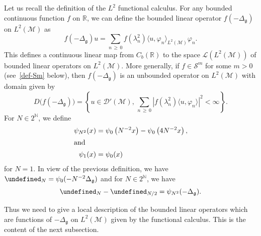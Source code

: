 \documentclass[10pt]{amsart}
\theoremstyle{definition}\newtheorem{defi}[theo]{Definition}\newtheorem{rema}[theo]{Remark}\newtheorem{exam}[theo]{Example}\newtheorem{exem}[theo]{Example}\newtheorem{nota}[theo]{Notation}
\newcommand{\R}{\mathbb{R}}
\newcommand{\N}{\mathbb{N}}
\let\P= \undefined
\newcommand{\P}{\mathbf{P}}
\renewcommand{\L}{\mathcal{L}}
\renewcommand{\S}{\mathcal{S}}
\newcommand{\Dp}{\mathcal{D}'}
\newcommand{\M}{\mathcal{M}}
\newcommand{\g}{\mathfrak{g}}
\newcommand{\Dlg}{\Delta_{\g}}
\begin{document}
Let us recall the definition of the $L^2$ functional calculus. For any bounded continuous function $f$ on $\R$, we can define the bounded linear operator $f(-\Dlg)$ on $L^2(\M)$ as
\begin{equation}\label{def-func-calculus}
f(-\Dlg)u = \sum_{n\,\geq\,0}f\left(\lambda_n^2\right)\langle u,\varphi_n\rangle_{L^2(\M)}\varphi_n.
\end{equation}
This defines a continuous linear map from $C_b(\R)$ to the space $\L(L^2(\M))$ of bounded linear operators on $L^2(\M)$. More generally, if $f\in\S^m$ for some $m>0$ (see~\eqref{def-Sm} below), then $f(-\Dlg)$ is an unbounded operator on $L^2(\M)$ with domain given by
\begin{equation*}
D\big(f(-\Dlg)\big) = \left\{u\in \Dp(\M),\,\sum_{n\,\geq\,0}\left|f\left(\lambda_n^2\right)\langle u,\varphi_n\rangle\right|^2<\infty\right\}.
\end{equation*}
For $N\in 2^{\N}$, we define
\begin{align*}
\psi_{N^2}(x) &= \psi_0\left(N^{-2}x\right)-\psi_0\left(4N^{-2}x\right),
\\
\intertext{and}
\psi_1(x) &= \psi_0(x)
\end{align*}
for $N=1$. In view of the previous definition, we have $\P_N = \psi_0(-N^{-2}\Dlg)$ and for $N\in 2^{\N}$, we have
\begin{equation*}
\P_N-\P_{N/2} = \psi_{N^2}(-\Dlg).
\end{equation*}

Thus we need to give a local description of the bounded linear operators which are functions of $-\Dlg$ on $L^2(\M)$ given by the functional calculus. This is the content of the next subsection.
\end{document}
